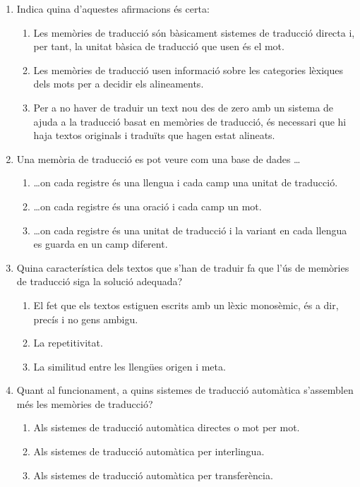 \begin{enumerate}

\item Indica quina d'aquestes afirmacions és certa:
  \begin{enumerate}
  \item Les memòries de traducció són bàsicament sistemes de traducció
    directa i, per tant, la unitat bàsica de traducció que usen és el
    mot.
  \item Les memòries de traducció usen informació sobre les categories
    lèxiques dels mots per a decidir els alineaments.
  \item Per a no haver de traduir un text nou des de zero amb un
    sistema de ajuda a la traducció basat en memòries de traducció, és
    necessari que hi haja textos originals i traduïts que hagen estat
    alineats.
  \end{enumerate}

\item Una memòria de traducció es pot veure com una base de dades
  \ldots
  \begin{enumerate}
  \item \ldots on cada registre és una llengua i cada camp una unitat
    de traducció.
  \item \ldots on cada registre és una oració i cada camp un mot.
  \item \ldots on cada registre és una unitat de traducció i la
    variant en cada llengua es guarda en un camp diferent.
  \end{enumerate}

\item Quina característica dels textos que s'han de traduir fa que
  l'ús de memòries de traducció siga la solució adequada?
  \begin{enumerate}
  \item El fet que els textos estiguen escrits amb un lèxic monosèmic,
    és a dir, precís i no gens ambigu.
  \item La repetitivitat.
  \item La similitud entre les llengües origen i meta.
  \end{enumerate}

\item Quant al funcionament, a quins sistemes de traducció automàtica
  s'assemblen més les memòries de traducció?
  \begin{enumerate}
  \item Als sistemes de traducció automàtica directes o mot per mot.
  \item Als sistemes de traducció automàtica per interlingua.
  \item Als sistemes de traducció automàtica per transferència.
  \end{enumerate}


\end{enumerate}
